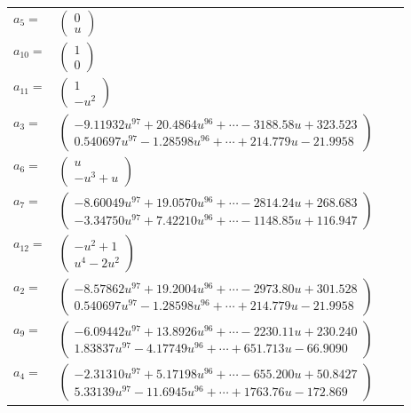 \documentclass[1p]{elsarticle_modified}
\theoremstyle{definition}
\begin{document}
\begin{tabular}{m{7pt} m{180pt} m{7pt} m{180pt} }
\flushright $a_{5}=$&$\begin{pmatrix}0\\u\end{pmatrix}$ \\
\flushright $a_{10}=$&$\begin{pmatrix}1\\0\end{pmatrix}$ \\
\flushright $a_{11}=$&$\begin{pmatrix}1\\- u^2\end{pmatrix}$ \\
\flushright $a_{3}=$&$\begin{pmatrix}-9.11932 u^{97}+20.4864 u^{96}+\cdots-3188.58 u+323.523\\0.540697 u^{97}-1.28598 u^{96}+\cdots+214.779 u-21.9958\end{pmatrix}$ \\
\flushright $a_{6}=$&$\begin{pmatrix}u\\- u^3+u\end{pmatrix}$ \\
\flushright $a_{7}=$&$\begin{pmatrix}-8.60049 u^{97}+19.0570 u^{96}+\cdots-2814.24 u+268.683\\-3.34750 u^{97}+7.42210 u^{96}+\cdots-1148.85 u+116.947\end{pmatrix}$ \\
\flushright $a_{12}=$&$\begin{pmatrix}- u^2+1\\u^4-2 u^2\end{pmatrix}$ \\
\flushright $a_{2}=$&$\begin{pmatrix}-8.57862 u^{97}+19.2004 u^{96}+\cdots-2973.80 u+301.528\\0.540697 u^{97}-1.28598 u^{96}+\cdots+214.779 u-21.9958\end{pmatrix}$ \\
\flushright $a_{9}=$&$\begin{pmatrix}-6.09442 u^{97}+13.8926 u^{96}+\cdots-2230.11 u+230.240\\1.83837 u^{97}-4.17749 u^{96}+\cdots+651.713 u-66.9090\end{pmatrix}$ \\
\flushright $a_{4}=$&$\begin{pmatrix}-2.31310 u^{97}+5.17198 u^{96}+\cdots-655.200 u+50.8427\\5.33139 u^{97}-11.6945 u^{96}+\cdots+1763.76 u-172.869\end{pmatrix}$ \\

\end{tabular}
\end{document}
